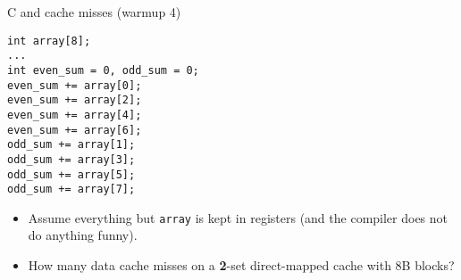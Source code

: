 
\begin{frame}[fragile,label=arrayMissesWarmup4]{C and cache misses (warmup 4)}
\begin{lstlisting}[style=smaller]
int array[8];
...
int even_sum = 0, odd_sum = 0;
even_sum += array[0];
even_sum += array[2];
even_sum += array[4];
even_sum += array[6];
odd_sum += array[1];
odd_sum += array[3];
odd_sum += array[5];
odd_sum += array[7];
\end{lstlisting}
\begin{itemize}
\item {\small
Assume everything but {\tt array} is kept in registers (and the compiler does not do
anything funny).}
\item How many data cache misses on a \textbf{2}-set direct-mapped cache with 8B blocks?
\end{itemize}
\end{frame}

